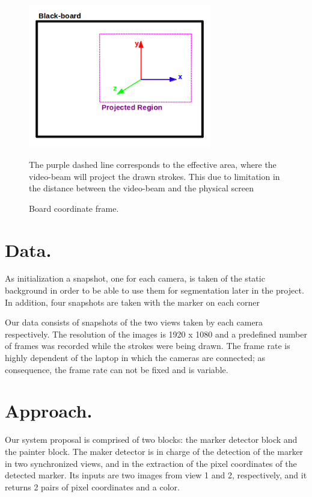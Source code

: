 \documentclass[a4paper,12pt]{article}
\begin{document}
\begin{figure}[H]
    \begin{center}
	\includegraphics[width=8cm]{boardCoordinates}
	\caption{Board coordinate frame.}
    The purple dashed line corresponds to the effective area, where the video-beam will project the drawn strokes. This due to limitation in the distance between the video-beam and the physical screen
	\label{fig:board}
    \end{center}
\end{figure}

\section{Data.}
As initialization a snapshot, one for each camera, is taken of the static background in order to be able to use them for segmentation later in the project. In addition, four snapshots are taken with the marker on each corner

Our data consists of snapshots of the two views taken by each camera respectively. The resolution of the images is 1920 x 1080 and a predefined number of frames was recorded while the strokes were being drawn. The frame rate is highly dependent of the laptop in which the cameras are connected; as consequence, the frame rate can not be fixed and is variable.


\section{Approach.}
Our system proposal is comprised of two blocks: the marker detector block and the painter block. The maker detector is in charge of the detection of the marker in two synchronized views, and in the extraction of the pixel coordinates of the detected marker. Its inputs are two images from view 1 and 2, respectively, and it returns 2 pairs of pixel coordinates and a color. 
\end{document}
